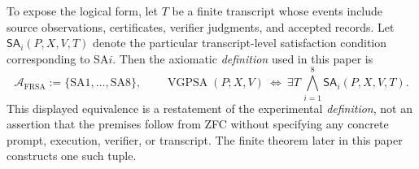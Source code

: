 \documentclass[11pt]{article}
\theoremstyle{remark}
\newcommand{\VGPSA}{\operatorname{VGPSA}}
\begin{document}
To expose the logical form, let $T$ be a finite transcript whose events
include source observations, certificates, verifier judgments, and accepted
records. Let $\mathsf{SA}_i(P,X,V,T)$ denote the particular transcript-level
satisfaction condition corresponding to SA$i$. Then the axiomatic \emph{definition}
used in this paper is
\begin{equation}\label{eq:frsa-axiom-conjunction}
\mathcal A_{\mathrm{FRSA}}:=\{\mathrm{SA1},\ldots,\mathrm{SA8}\},\qquad
\VGPSA(P;X,V)\ \Longleftrightarrow\
\exists T\,\bigwedge_{i=1}^{8}\mathsf{SA}_i(P,X,V,T).
\end{equation}
This displayed equivalence is a restatement of the experimental \emph{definition},
not an assertion that the premises follow from ZFC without specifying any
concrete prompt, execution, verifier, or transcript. The finite theorem
later in this paper constructs one such tuple.
\end{document}

